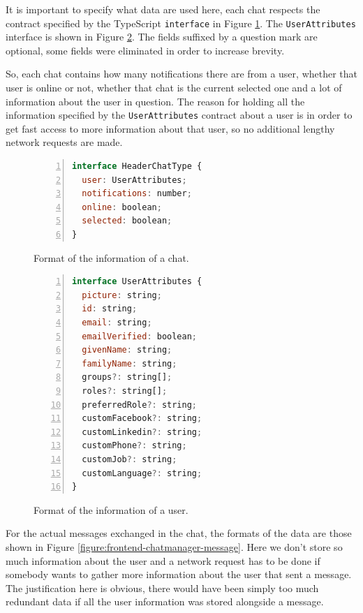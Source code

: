  It is important to specify what data are used here, each chat respects the contract specified by the TypeScript \verb|interface| in Figure \ref{figure:frontend-chatmanager-headerchat}. The \verb|UserAttributes| interface is shown in Figure \ref{figure:frontend-chatmanager-userattributes}. The fields suffixed by a question mark are optional, some fields were eliminated in order to increase brevity.

So, each chat contains how many notifications there are from a user, whether that user is online or not, whether that chat is the current selected one and a lot of information about the user in question. The reason for holding all the information specified by the \verb|UserAttributes| contract about a user is in order to get fast access to more information about that user, so no additional lengthy network requests are made.

\begin{figure}[H]
\begin{lstlisting}[numbers=left,language=JavaScript]
interface HeaderChatType {
  user: UserAttributes;
  notifications: number;
  online: boolean;
  selected: boolean;
}
\end{lstlisting}
\caption{Format of the information of a chat.}
\label{figure:frontend-chatmanager-headerchat}
\end{figure}

\begin{figure}[H]
\begin{lstlisting}[numbers=left,language=JavaScript]
interface UserAttributes {
  picture: string;
  id: string;
  email: string;
  emailVerified: boolean;
  givenName: string;
  familyName: string;
  groups?: string[];
  roles?: string[];
  preferredRole?: string;
  customFacebook?: string;
  customLinkedin?: string;
  customPhone?: string;
  customJob?: string;
  customLanguage?: string;
}
\end{lstlisting}
\caption{Format of the information of a user.}
\label{figure:frontend-chatmanager-userattributes}
\end{figure}

For the actual messages exchanged in the chat, the formats of the data are those shown in Figure \ref{figure:frontend-chatmanager-message}. Here we don't store so much information about the user and a network request has to be done if somebody wants to gather more information about the user that sent a message. The justification here is obvious, there would have been simply too much redundant data if all the user information was stored alongside a message.

